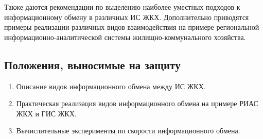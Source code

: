 Также даются рекомендации по выделению наиболее уместных подходов к информационному обмену в различных ИС ЖКХ.
Дополнительно приводятся примеры реализации различных видов взаимодействия на примере региональной информационно-аналитической системы жилищно-коммунального хозяйства.

\subsection*{Положения, выносимые на защиту}

\begin{enumerate}
	\item Описание видов информационного обмена между ИС ЖКХ.
	\item Практическая реализация видов информационного обмена на примере РИАС ЖКХ и ГИС ЖКХ.
	\item Вычислительные эксперименты по скорости информационного обмена.
\end{enumerate}

\clearpage
\newpage